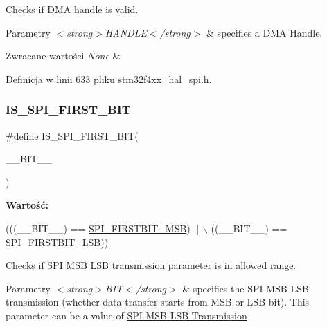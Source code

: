 Checks if D\+MA handle is valid. 


\begin{DoxyParams}{Parametry}
{\em $<$strong$>$\+H\+A\+N\+D\+L\+E$<$/strong$>$} & specifies a D\+MA Handle. \\
\hline
\end{DoxyParams}

\begin{DoxyRetVals}{Zwracane wartości}
{\em None} & \\
\hline
\end{DoxyRetVals}


Definicja w linii 633 pliku stm32f4xx\+\_\+hal\+\_\+spi.\+h.

\mbox{\label{group___s_p_i___private___macros_ga780c503aa8adae30dea1f034ac500d7f}} 
\subsubsection{\texorpdfstring{I\+S\+\_\+\+S\+P\+I\+\_\+\+F\+I\+R\+S\+T\+\_\+\+B\+IT}{IS\_SPI\_FIRST\_BIT}}
{\footnotesize\ttfamily \#define I\+S\+\_\+\+S\+P\+I\+\_\+\+F\+I\+R\+S\+T\+\_\+\+B\+IT(\begin{DoxyParamCaption}\item[{}]{\+\_\+\+\_\+\+B\+I\+T\+\_\+\+\_\+ }\end{DoxyParamCaption})}

{\bfseries Wartość\+:}
\begin{DoxyCode}
(((\_\_BIT\_\_) == \hyperlink{group___s_p_i___m_s_b___l_s_b__transmission_ga2280ac1a6ed587b516419b5df6a8ea55}{SPI\_FIRSTBIT\_MSB}) || \(\backslash\)
                                   ((\_\_BIT\_\_) == \hyperlink{group___s_p_i___m_s_b___l_s_b__transmission_ga8b608690a1adf9df40f271c228a479a3}{SPI\_FIRSTBIT\_LSB}))
\end{DoxyCode}


Checks if S\+PI M\+SB L\+SB transmission parameter is in allowed range. 


\begin{DoxyParams}{Parametry}
{\em $<$strong$>$\+B\+I\+T$<$/strong$>$} & specifies the S\+PI M\+SB L\+SB transmission (whether data transfer starts from M\+SB or L\+SB bit). This parameter can be a value of \hyperlink{group___s_p_i___m_s_b___l_s_b__transmission}{S\+PI M\+SB L\+SB Transmission} \\
\hline
\end{DoxyParams}

